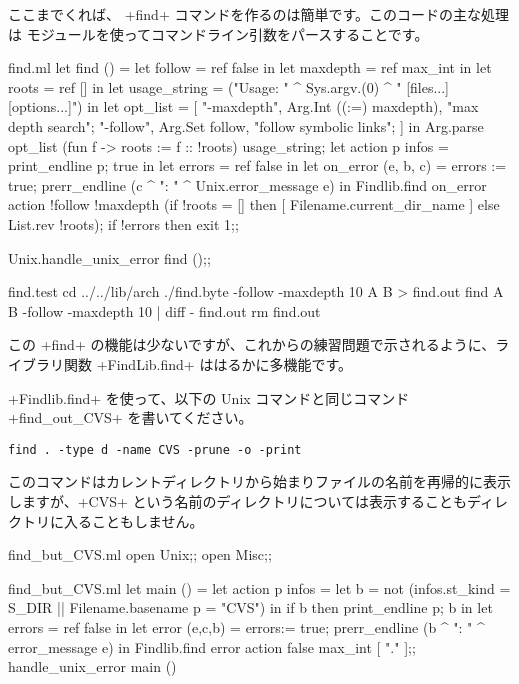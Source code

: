 ここまでくれば、 \ml+find+ コマンドを作るのは簡単です。このコードの主な処理は  モジュールを使ってコマンドライン引数をパースすることです。
\begin{listingcodefile}{find.ml}
let find () =
  let follow = ref false in
  let maxdepth = ref max_int in
  let roots = ref [] in
  let usage_string  =
    ("Usage: " ^ Sys.argv.(0) ^ " [files...] [options...]") in
  let opt_list =  [
    "-maxdepth", Arg.Int ((:=) maxdepth), "max depth search";
    "-follow", Arg.Set follow, "follow symbolic links";
  ] in
  Arg.parse opt_list (fun f -> roots := f :: !roots) usage_string;
  let action p infos = print_endline p; true in
  let errors = ref false in
  let on_error (e, b, c) =
    errors := true; prerr_endline (c ^ ": " ^ Unix.error_message e) in
  Findlib.find on_error action !follow !maxdepth
    (if !roots = [] then [ Filename.current_dir_name ]
     else List.rev !roots);
  if !errors then exit 1;;

Unix.handle_unix_error find ();;
\end{listingcodefile}
%
\begin{codefile}{find.test}
cd ../../lib/arch
./find.byte -follow -maxdepth 10 A B > find.out
find A B -follow -maxdepth 10 | diff - find.out
rm find.out
\end{codefile}
この \ml+find+ の機能は少ないですが、これからの練習問題で示されるように、ライブラリ関数 \ml+FindLib.find+ ははるかに多機能です。

\begin{exercise}
\ml+Findlib.find+ を使って、以下の Unix コマンドと同じコマンド \ml+find_out_CVS+ を書いてください。
\begin{lstlisting}
find . -type d -name CVS -prune -o -print
\end{lstlisting}
このコマンドはカレントディレクトリから始まりファイルの名前を再帰的に表示しますが、\ml+CVS+ という名前のディレクトリについては表示することもディレクトリに入ることもしません。
\end{exercise}
\begin{answer}
\begin{codefile}{find_but_CVS.ml}
open Unix;;
open Misc;;
\end{codefile}
%
\begin{listingcodefile}{find_but_CVS.ml}
let main () =
  let action p infos =
    let b = not (infos.st_kind = S_DIR || Filename.basename p = "CVS") in
    if b then print_endline p; b in
  let errors = ref false in
  let error (e,c,b) =
    errors:= true; prerr_endline (b ^ ": " ^ error_message e) in
  Findlib.find error action false max_int [ "." ];;
handle_unix_error main ()
\end{listingcodefile}
\end{answer}


